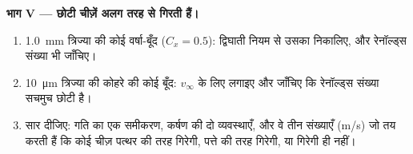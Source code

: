 \begin{problem}
\medskip
\noindent\textbf{भाग V --- छोटी चीज़ें अलग तरह से गिरती हैं।}
\begin{enumerate}[resume]
  \item \qty{1.0}{mm} त्रिज्या की कोई वर्षा-बूँद ($C_x = 0.5$): द्विघाती
        नियम से उसका  निकालिए, और रेनॉल्ड्स संख्या भी जाँचिए।
  \item \qty{10}{\micro m} त्रिज्या की कोहरे की कोई बूँद: $v_\infty$ के
        लिए  लगाइए और जाँचिए कि रेनॉल्ड्स संख्या सचमुच छोटी
        है।
  \item सार दीजिए: गति का एक समीकरण, कर्षण की दो व्यवस्थाएँ, और वे तीन
        संख्याएँ (\unit{m/s}) जो तय करती हैं कि कोई चीज़ पत्थर की तरह
        गिरेगी, पत्ते की तरह गिरेगी, या गिरेगी ही नहीं।
\end{enumerate}
\end{problem}
